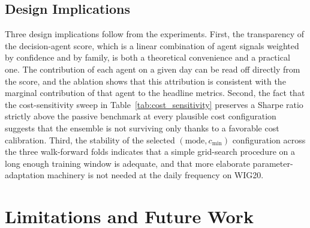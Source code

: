 \documentclass{ieeeaccess}
\begin{document}
\subsection{Design Implications}

Three design implications follow from the experiments. First, the transparency of the decision-agent score, which is a linear combination of agent signals weighted by confidence and by family, is both a theoretical convenience and a practical one. The contribution of each agent on a given day can be read off directly from the score, and the ablation shows that this attribution is consistent with the marginal contribution of that agent to the headline metrics. Second, the fact that the cost-sensitivity sweep in Table~\ref{tab:cost_sensitivity} preserves a Sharpe ratio strictly above the passive benchmark at every plausible cost configuration suggests that the ensemble is not surviving only thanks to a favorable cost calibration. Third, the stability of the selected $(\text{mode}, c_{\min})$ configuration across the three walk-forward folds indicates that a simple grid-search procedure on a long enough training window is adequate, and that more elaborate parameter-adaptation machinery is not needed at the daily frequency on WIG20.

\section{Limitations and Future Work}
\label{sec:limitations}
\end{document}
